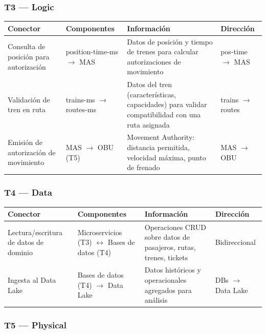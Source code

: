\documentclass[a4paper, 10 pt]{article}
\begin{document}
\subsubsection{T3 --- Logic}

\begin{table}[H]
\centering
\footnotesize
\begin{tabular}{|R{0.18\textwidth}|R{0.2\textwidth}|R{0.32\textwidth}|M{0.14\textwidth}|}
\hline
\textbf{Conector} & \textbf{Componentes} & \textbf{Información} & \textbf{Dirección} \\
\hline
Consulta de posición para autorización & position-time-ms $\rightarrow$ MAS & Datos de posición y tiempo de trenes para calcular autorizaciones de movimiento & pos-time $\rightarrow$ MAS \\
\hline
Validación de tren en ruta & trains-ms $\rightarrow$ routes-ms & Datos del tren (características, capacidades) para validar compatibilidad con una ruta asignada & trains $\rightarrow$ routes \\
\hline
Emisión de autorización de movimiento & MAS $\rightarrow$ OBU (T5) & Movement Authority: distancia permitida, velocidad máxima, punto de frenado & MAS $\rightarrow$ OBU \\
\hline
\end{tabular}
\end{table}

\subsubsection{T4 --- Data}

\begin{table}[H]
\centering
\footnotesize
\begin{tabular}{|R{0.18\textwidth}|R{0.2\textwidth}|R{0.32\textwidth}|M{0.14\textwidth}|}
\hline
\textbf{Conector} & \textbf{Componentes} & \textbf{Información} & \textbf{Dirección} \\
\hline
Lectura/escritura de datos de dominio & Microservicios (T3) $\leftrightarrow$ Bases de datos (T4) & Operaciones CRUD sobre datos de pasajeros, rutas, trenes, tickets & Bidireccional \\
\hline
Ingesta al Data Lake & Bases de datos (T4) $\rightarrow$ Data Lake & Datos históricos y operacionales agregados para análisis & DBs $\rightarrow$ Data Lake \\
\hline
\end{tabular}
\end{table}

\subsubsection{T5 --- Physical}
\end{document}

